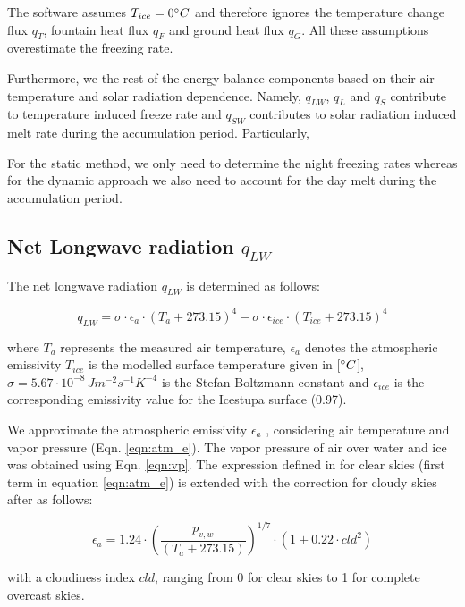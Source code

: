 \documentclass[utf8]{frontiersSCNS}
\begin{document}
The software assumes $T_{ice} = 0 \degree C$ and therefore ignores the temperature change flux $q_{T}$, fountain
heat flux $q_{F}$ and ground heat flux $q_{G}$. All these assumptions overestimate the freezing rate.

Furthermore, we the rest of the energy balance components based on their air temperature and solar
radiation dependence. Namely, $q_{LW}$, $q_{L}$ and $q_{S}$ contribute to temperature induced freeze rate and
$q_{SW}$ contributes to solar radiation induced melt rate during the accumulation period.  Particularly,

For the static method, we only need to determine the night freezing rates whereas for the dynamic approach we
also need to account for the day melt during the accumulation period.

\subsection{Net Longwave radiation \texorpdfstring{$q_{LW}$}{Lg}} \label{sec:LW}
The net longwave radiation $q_{LW}$ is determined as follows:

\begin{equation}
	q_{LW}= \sigma \cdot \epsilon_a \cdot {(T_a+ 273.15)}^4 -\sigma \cdot \epsilon_{ice} \cdot {(T_{ice}+ 273.15)}^4
	\label{eqn:LW}
\end{equation}

where $T_a$ represents the measured air temperature, $\epsilon_a$ denotes the atmospheric emissivity $T_{ice}$
is the modelled surface temperature given in [$\degree C$], $\sigma=5.67\cdot10^{-8}\,Jm^{-2}s^{-1}K^{-4}$ is
the Stefan-Boltzmann constant and $\epsilon_{ice}$ is the corresponding emissivity value for the Icestupa
surface (0.97).

We approximate the atmospheric emissivity $\epsilon_a$ ,
considering air temperature and vapor pressure (Eqn. \ref{eqn:atm_e}). The vapor pressure of air over water and
ice was obtained using Eqn. \ref{eqn:vp}.  The expression defined in \cite{brutsaertDerivableFormulaLongwave1975} for clear skies
(first term in equation \ref{eqn:atm_e}) is extended with the correction for cloudy skies after
\cite{brutsaertEvaporationAtmosphereTheory1982} as follows:

\begin{equation}
	\epsilon_a=1.24 \cdot (\frac{p_{v,w}}{(T_a+273.15)})^{1/7}\cdot(1+0.22\cdot{cld}^2) \label{eqn:atm_e}
\end{equation}

with a cloudiness index $cld$, ranging from 0 for clear skies to 1 for complete overcast skies. 
\end{document}
